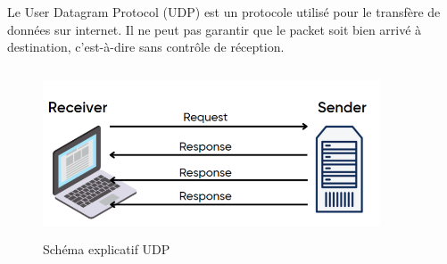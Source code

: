 Le User Datagram Protocol (UDP) est un protocole utilisé pour le transfère de données sur internet. Il ne peut pas garantir que le packet soit bien arrivé à destination, c'est-à-dire sans contrôle de réception.
\begin{figure}[h]
    \centering
    \includegraphics[width=100mm, height=50mm]{images/UDP.png}
    \caption{Schéma explicatif UDP}
    \label{img:mesh14}
\end{figure}